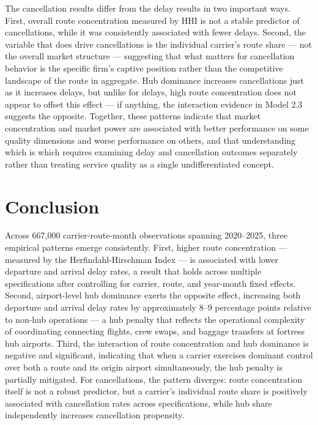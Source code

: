 \documentclass[preprint,12pt,authoryear]{elsarticle}
\begin{document}
The cancellation results differ from the delay results in two important ways. First, overall route concentration measured by HHI is not a stable predictor of cancellations, while it was consistently associated with fewer delays. Second, the variable that does drive cancellations is the individual carrier's route share — not the overall market structure — suggesting that what matters for cancellation behavior is the specific firm's captive position rather than the competitive landscape of the route in aggregate. Hub dominance increases cancellations just as it increases delays, but unlike for delays, high route concentration does not appear to offset this effect — if anything, the interaction evidence in Model 2.3 suggests the opposite. Together, these patterns indicate that market concentration and market power are associated with better performance on some quality dimensions and worse performance on others, and that understanding which is which requires examining delay and cancellation outcomes separately rather than treating service quality as a single undifferentiated concept.

\section{Conclusion}
Across 667,000 carrier-route-month observations spanning 2020–2025, three empirical patterns emerge consistently. First, higher route concentration — measured by the Herfindahl-Hirschman Index — is associated with lower departure and arrival delay rates, a result that holds across multiple specifications after controlling for carrier, route, and year-month fixed effects. Second, airport-level hub dominance exerts the opposite effect, increasing both departure and arrival delay rates by approximately 8–9 percentage points relative to non-hub operations — a hub penalty that reflects the operational complexity of coordinating connecting flights, crew swaps, and baggage transfers at fortress hub airports. Third, the interaction of route concentration and hub dominance is negative and significant, indicating that when a carrier exercises dominant control over both a route and its origin airport simultaneously, the hub penalty is partially mitigated. For cancellations, the pattern diverges: route concentration itself is not a robust predictor, but a carrier's individual route share is positively associated with cancellation rates across specifications, while hub share independently increases cancellation propensity.
\end{document}
